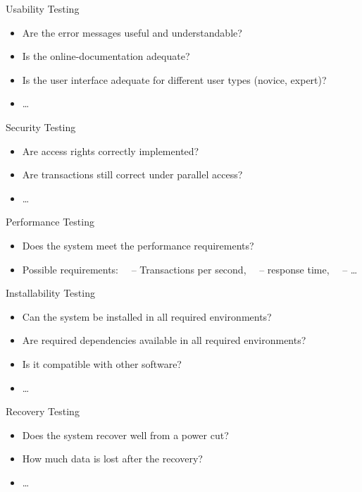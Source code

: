 \begin{Frame}{Usability Testing}
  \begin{itemize}
    \item Are the error messages useful and understandable?
    \item Is the online-documentation adequate?
    \item Is the user interface adequate for different user types (novice, expert)?
    \item \ldots
  \end{itemize}
\end{Frame}

\begin{Frame}{Security Testing}
  \begin{itemize}
    \item Are access rights correctly implemented?
    \item Are transactions still correct under parallel access?
    \item \ldots
  \end{itemize}
\end{Frame}

\begin{Frame}{Performance Testing}
  \begin{itemize}
    \item Does the system meet the performance requirements?
    \item Possible requirements:\newline
      \ \ -- Transactions per second,\newline
      \ \ -- response time,\newline
      \ \ -- \ldots
  \end{itemize}
\end{Frame}
  
\begin{Frame}{Installability Testing}
  \begin{itemize}
    \item Can the system be installed in all
required environments?
    \item Are required dependencies available in all required environments?
    \item Is it compatible with other software?
    \item \ldots
  \end{itemize}
\end{Frame}

\begin{Frame}{Recovery Testing}
  \begin{itemize}
    \item Does the system recover well from a power cut?
    \item How much data is lost after the recovery?
    \item \ldots
  \end{itemize}
\end{Frame}

